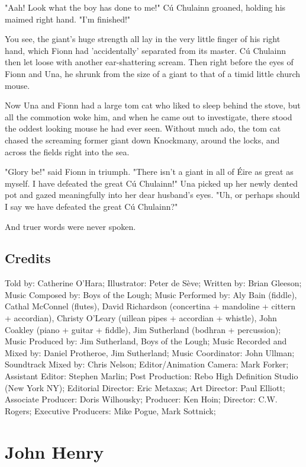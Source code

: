 "Aah! Look what the boy has done to me!" Cú Chulainn groaned, holding his maimed right hand. "I'm finished!"

You see, the giant's huge strength all lay in the very little finger of his right hand, which Fionn had 'accidentally' separated from its master. Cú Chulainn then let loose with another ear-shattering scream. Then right before the eyes of Fionn and Una, he shrunk from the size of a giant to that of a timid little church mouse.

Now Una and Fionn had a large tom cat who liked to sleep behind the stove, but all the commotion woke him, and when he came out to investigate, there stood the oddest looking mouse he had ever seen. Without much ado, the tom cat chased the screaming former giant down Knockmany, around the locks, and across the fields right into the sea.

"Glory be!" said Fionn in triumph. "There isn't a giant in all of Éire as great as myself. I have defeated the great Cú Chulainn!" Una picked up her newly dented pot and gazed meaningfully into her dear husband's eyes. "Uh, or perhaps should I say we have defeated the great Cú Chulainn?"

And truer words were never spoken.

\subsection{Credits}

Told by: Catherine O'Hara;
Illustrator: Peter de Sève;
Written by: Brian Gleeson;
Music Composed by: Boys of the Lough;
Music Performed by: Aly Bain (fiddle), Cathal McConnel (flutes), David Richardson (concertina + mandoline + cittern + accordian), Christy O'Leary (uillean pipes + accordian + whistle), John Coakley (piano + guitar + fiddle), Jim Sutherland (bodhran + percussion);
Music Produced by: Jim Sutherland, Boys of the Lough;
Music Recorded and Mixed by: Daniel Protheroe, Jim Sutherland;
Music Coordinator: John Ullman;
Soundtrack Mixed by: Chris Nelson;
Editor/Animation Camera: Mark Forker;
Assistant Editor: Stephen Marlin;
Post Production: Rebo High Definition Studio (New York NY);
Editorial Director: Eric Metaxas;
Art Director: Paul Elliott;
Associate Producer: Doris Wilhousky;
Producer: Ken Hoin;
Director: C.W. Rogers;
Executive Producers: Mike Pogue, Mark Sottnick;

\section{John Henry}

